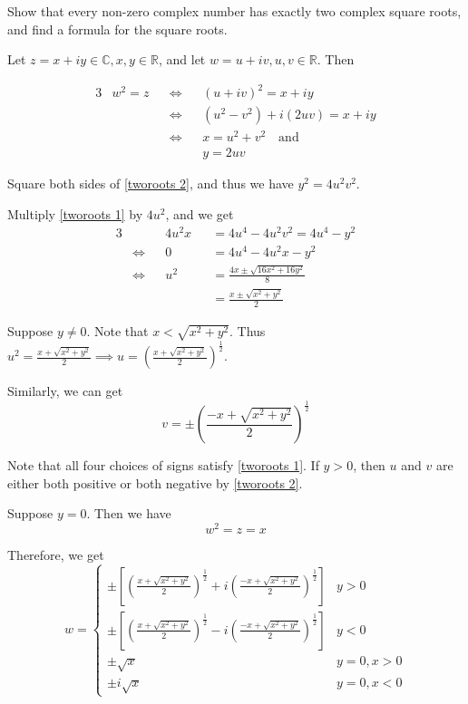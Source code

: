 \documentclass[11pt, oneside]{book}
\begin{document}
\begin{eg}
	\label{eg:complex number has exactly two roots}
	Show that every non-zero complex number has exactly two complex square roots, and find a formula for the square roots.

	Let $z = x + iy \in \mathbb{C}, x, y \in \mathbb{R}$, and let $w = u + iv, u, v \in \mathbb{R}$. Then

	\begin{alignat}{3}
		&w^2 = z &&\iff && (u + iv)^2 = x + iy \nonumber \\
		&	&&\iff 	&& (u^2 - v^2) + i(2uv) = x + iy \nonumber \\
		&	&&\iff && x = u^2 + v^2 \quad \text{and} \label{tworoots 1} \\
		&	&&	   && y = 2uv \label{tworoots 2}
	\end{alignat}

	Square both sides of \cref{tworoots 2}, and thus we have $y^2 = 4u^2 v^2$.

	Multiply \cref{tworoots 1} by $4u^2$, and we get
	\begin{alignat*}{3}
		& 	  &&4u^2 x &&= 4u^4 - 4u^2 v^2 = 4u^4 - y^2 \\
		&\iff &&0 	&&= 4u^4 - 4u^2 x - y^2 \\
		&\iff &&u^2 &&= \frac{4x \pm \sqrt{16x^2 + 16y^2}}{8} \\
		&	  &&	&&= \frac{x \pm \sqrt{x^2 + y^2}}{2} 
	\end{alignat*}

	Suppose $y \neq 0$. Note that $x < \sqrt{x^2 + y^2}$. Thus $u^2 = \frac{x + \sqrt{x^2 + y^2}}{2} \implies u = \left(\frac{x + \sqrt{x^2 + y^2}}{2} \right)^{\frac{1}{2}}$.

	Similarly, we can get
	\begin{equation*}
		v = \pm \left(\frac{-x + \sqrt{x^2 + y^2}}{2}\right)^{\frac{1}{2}}
	\end{equation*}

	Note that all four choices of signs satisfy \cref{tworoots 1}. If $y > 0$, then $u$ and $v$ are either both positive or both negative by \cref{tworoots 2}.

	Suppose $y = 0$. Then we have
	\begin{equation*}
		w^2 = z = x
	\end{equation*}

	Therefore, we get
	\begin{equation*}
		w = \begin{cases}
			\pm \left[ \left(\frac{x + \sqrt{x^2 + y^2}}{2} \right)^{\frac{1}{2}} + i \left( \frac{-x + \sqrt{x^2 + y^2}}{2} \right)^{\frac{1}{2}} \right] & y > 0 \\
			\pm \left[ \left(\frac{x + \sqrt{x^2 + y^2}}{2} \right)^{\frac{1}{2}} - i \left(\frac{-x + \sqrt{x^2 + y^2}}{2} \right)^{\frac{1}{2}} \right] & y < 0 \\
			\pm \sqrt{x} & y = 0, x > 0 \\
			\pm i \sqrt{x} & y = 0, x < 0
		\end{cases}
	\end{equation*}
\end{eg}
\end{document}
